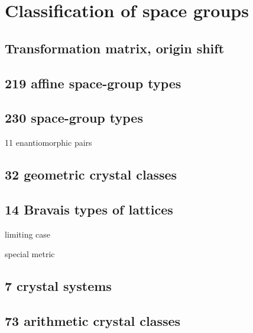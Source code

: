 \section{\label{sec:classification}Classification of space groups}

\subsection{Transformation matrix, origin shift}

\subsection{219 affine space-group types}

\subsection{230 space-group types}

11 enantiomorphic pairs

\subsection{32 geometric crystal classes}

\subsection{14 Bravais types of lattices}

limiting case

special metric

\subsection{7 crystal systems}

\subsection{73 arithmetic crystal classes}
